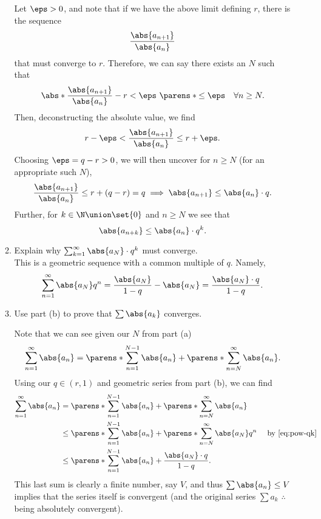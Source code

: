 \documentclass{article}
\begin{document}
\begin{enumerate}
\begin{enumerate}
                Let $\eps > 0$, and note that if we have the above limit defining $r$, there is the sequence
                \[ \frac{\abs{a_{n + 1}}}{\abs{a_{n}}} \]
                that must converge to $r$. Therefore, we can say there exists an $N$ such that
                \[ \abs*{\frac{\abs{a_{n + 1}}}{\abs{a_{n}}} - r} < \eps \ \parens*{\le \eps} \quad \forall n \ge N. \]
                Then, deconstructing the absolute value, we find
                \[
                r -\eps < \frac{\abs{a_{n + 1}}}{\abs{a_{n}}} \le r + \eps.
                \]
                Choosing $\eps = q - r > 0$, we will then uncover for $n \ge N$ (for an appropriate such $N$),
                \[
                \frac{\abs{a_{n + 1}}}{\abs{a_{n}}} \le r + (q - r) = q \implies \abs{a_{n + 1}} \le \abs{a_{n}} \cdot q.
                \]
                Further, for $k \in \N \union \set{0}$ and $n \ge N$ we see that
                \begin{equation}\label{eq:pow-qk} \abs{a_{n + k}} \le \abs{a_{n}} \cdot q^{k}. \end{equation}

          \item Explain why $\sum_{k = 1}^{\infty}\abs{a_{N}} \cdot q^{k}$ must converge.\\
                This is a geometric sequence with a common multiple of $q$. Namely,
                \[ \sum_{n = 1}^{\infty}\abs{a_{N}}q^{n} = \frac{\abs{a_{N}}}{1 - q} - \abs{a_{N}} = \frac{\abs{a_{N}}\cdot q}{1 - q}. \]
          \item Use part (b) to prove that $\sum\abs{a_{k}}$ converges.

                Note that we can see given our $N$ from part (a)
                \[
                \sum_{n = 1}^{\infty}\abs{a_{n}} = \parens*{\sum_{n = 1}^{N - 1}\abs{a_{n}}} + \parens*{\sum_{n = N}^{\infty}\abs{a_{n}}}.
                \]
                Using our $q \in (r, 1)$ and geometric series from part (b), we can find
                \begin{align*}
                  \sum_{n = 1}^{\infty}\abs{a_{n}} &= \parens*{\sum_{n = 1}^{N - 1}\abs{a_{n}}} + \parens*{\sum_{n = N}^{\infty}\abs{a_{n}}}\\
                  &\le \parens*{\sum_{n = 1}^{N - 1}\abs{a_{n}}} + \parens*{\sum_{n = N}^{\infty}\abs{a_{N}}q^{n}} \quad \textrm{ by~\eqref{eq:pow-qk} }\\
                  &\le \parens*{\sum_{n = 1}^{N - 1}\abs{a_{n}}} + \frac{\abs{a_{N}} \cdot q}{1 - q}.\\
                \end{align*}
                This last sum is clearly a finite number, say $V$, and thus $\sum\abs{a_{n}} \le V$ implies that the series itself
                is convergent (and the original series $\sum a_{k}$ $\therefore$ being absolutely convergent).
        \end{enumerate}


\end{enumerate}
\end{document}
